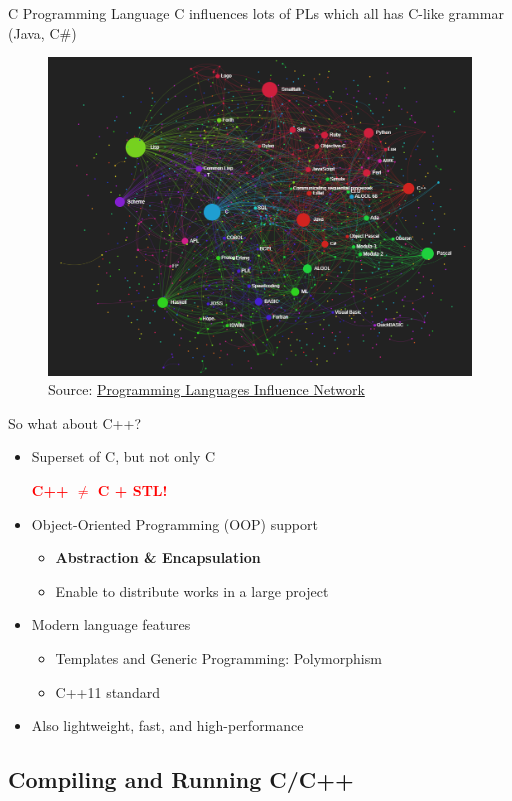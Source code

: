 \documentclass{../TexTemplate/myslide}
\begin{document}
\begin{frame}{C Programming Language}
C influences lots of PLs which all has C-like grammar (Java, C\#)
\begin{figure}[H]
\centering
\includegraphics[width=0.7\linewidth]{fig/pl_influence_network.png}
\caption*{\scriptsize Source: \href{https://exploring-data.com/vis/programming-languages-influence-network/}{Programming Languages Influence Network}}
\end{figure}
\end{frame}

\begin{frame}{So what about C++?}
\begin{itemize}[<+->]
\item Superset of C, but not only C
\begin{center}
\Large\textcolor{red}{\textbf{C++ $\ne$ C + STL!}}
\end{center}
\item Object-Oriented Programming (OOP) support
\begin{itemize}
	\item \textbf{Abstraction \& Encapsulation}
	\item Enable to distribute works in a large project
\end{itemize}
\item Modern language features
\begin{itemize}
	\item Templates and Generic Programming: Polymorphism
	\item C++11 standard
\end{itemize}
\item Also lightweight, fast, and high-performance
\end{itemize}
\end{frame}

\subsection{Compiling and Running C/C++}
\begin{frame}
\subsectionpage
\end{frame}
\end{document}
